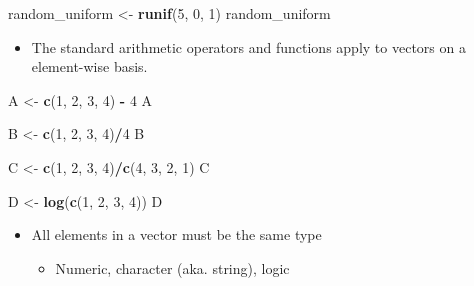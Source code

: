 \documentclass[
]{book}
\newenvironment{Shaded}{\begin{snugshade}}{\end{snugshade}}
\newcommand{\DecValTok}[1]{\textcolor[rgb]{0.00,0.00,0.81}{#1}}
\newcommand{\FunctionTok}[1]{\textcolor[rgb]{0.13,0.29,0.53}{\textbf{#1}}}
\newcommand{\NormalTok}[1]{#1}
\newcommand{\OtherTok}[1]{\textcolor[rgb]{0.56,0.35,0.01}{#1}}
\newcommand{\SpecialCharTok}[1]{\textcolor[rgb]{0.81,0.36,0.00}{\textbf{#1}}}
\providecommand{\tightlist}{%
  \setlength{\itemsep}{0pt}\setlength{\parskip}{0pt}}
\begin{document}
\begin{Shaded}
\begin{Highlighting}[]
\NormalTok{random\_uniform }\OtherTok{\textless{}{-}} \FunctionTok{runif}\NormalTok{(}\DecValTok{5}\NormalTok{, }\DecValTok{0}\NormalTok{, }\DecValTok{1}\NormalTok{)}
\NormalTok{random\_uniform}
\end{Highlighting}
\end{Shaded}

\begin{itemize}
\tightlist
\item
  The standard arithmetic operators and functions apply to vectors on a element-wise basis.
\end{itemize}

\begin{Shaded}
\begin{Highlighting}[]
\NormalTok{A }\OtherTok{\textless{}{-}} \FunctionTok{c}\NormalTok{(}\DecValTok{1}\NormalTok{, }\DecValTok{2}\NormalTok{, }\DecValTok{3}\NormalTok{, }\DecValTok{4}\NormalTok{) }\SpecialCharTok{{-}} \DecValTok{4}
\NormalTok{A}

\NormalTok{B }\OtherTok{\textless{}{-}} \FunctionTok{c}\NormalTok{(}\DecValTok{1}\NormalTok{, }\DecValTok{2}\NormalTok{, }\DecValTok{3}\NormalTok{, }\DecValTok{4}\NormalTok{)}\SpecialCharTok{/}\DecValTok{4}
\NormalTok{B}

\NormalTok{C }\OtherTok{\textless{}{-}} \FunctionTok{c}\NormalTok{(}\DecValTok{1}\NormalTok{, }\DecValTok{2}\NormalTok{, }\DecValTok{3}\NormalTok{, }\DecValTok{4}\NormalTok{)}\SpecialCharTok{/}\FunctionTok{c}\NormalTok{(}\DecValTok{4}\NormalTok{, }\DecValTok{3}\NormalTok{, }\DecValTok{2}\NormalTok{, }\DecValTok{1}\NormalTok{)}
\NormalTok{C}

\NormalTok{D }\OtherTok{\textless{}{-}} \FunctionTok{log}\NormalTok{(}\FunctionTok{c}\NormalTok{(}\DecValTok{1}\NormalTok{, }\DecValTok{2}\NormalTok{, }\DecValTok{3}\NormalTok{, }\DecValTok{4}\NormalTok{))}
\NormalTok{D}
\end{Highlighting}
\end{Shaded}

\begin{itemize}
\tightlist
\item
  All elements in a vector must be the same type

  \begin{itemize}
  \tightlist
  \item
    Numeric, character (aka. string), logic
  \end{itemize}
\end{itemize}
\end{document}
